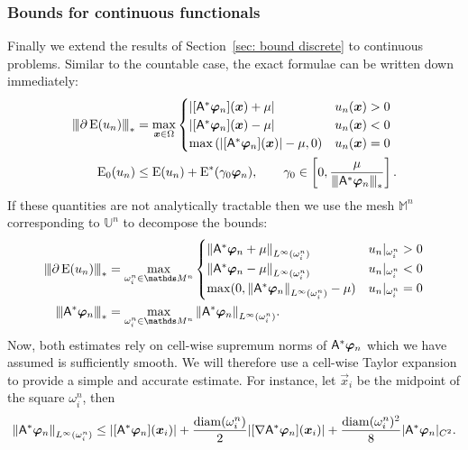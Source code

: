 \documentclass[smallextended]{svjour3}
\let\F\mathds\let\C\mathcal\newcommand{\R}{\F{R}}\newcommand{\A}{\tens{A}}
\newcommand{\norm}[1]{{\left\lVert #1 \right\rVert}}
\newcommand{\Norm}[1]{{\left\vert\kern-0.25ex\left\vert\kern-0.25ex\left\vert #1 \right\vert\kern-0.25ex\right\vert\kern-0.25ex\right\vert}}
\newcommand{\op}[1]{\operatorname{#1}}
\newcommand{\1}{\F{1}}
\newcommand{\Domain}{\Omega}\newcommand{\domain}{\omega}
\newcommand*{\var}[1]{%
	\IfEqCase{#1}{%
		{0}{u}%
		{1}{v}%
		{2}{w}%
	}[u#1]%
}
\newcommand*{\vars}[1]{%
	\IfEqCase{#1}{%
		{0}{\alpha}%
		{1}{\beta}%
		{2}{\gamma}%
		{3}{a}%
		{4}{b}%
		{5}{c}%
	}[k#1]%
}
\begin{document}
	\subsubsection{Bounds for continuous functionals}\label{sec: bound continuous}
	Finally we extend the results of Section~\ref{sec: bound discrete} to continuous problems. Similar to the countable case, the exact formulae can be written down immediately:
	\begin{align}
		\Norm{\partial\op{E}(\var0_n)}_* &= \max_{\vec{x}\in\Domain}\begin{cases}
			|[\A^*\vec{\varphi}_n](\vec{x}) + \mu| & \var0_n(\vec{x})>0
			\\|[\A^*\vec{\varphi}_n](\vec{x}) - \mu| & \var0_n(\vec{x})<0
			\\\max\left(|[\A^*\vec{\varphi}_n](\vec{x})| - \mu, 0\right) & \var0_n(\vec{x}) = 0
		\end{cases}
		\\ \op{E}_0(\var0_n) &\leq \op{E}(\var0_n) + \op{E}^*(\vars2_0\vec{\varphi}_n), \qquad \vars2_0\in\left[0,\frac{\mu}{\Norm{\A^*\vec{\varphi}_n}_*}\right].
	\end{align}
	If these quantities are not analytically tractable then we use the mesh $\F M^n$ corresponding to $\F{U}^n$ to decompose the bounds:
	\begin{align}
		\Norm{\partial \op{E}(\var0_n)}_* &= \max_{\domain_i^n\in\F M^n} \begin{cases}
			\norm{\A^*\vec{\varphi}_n + \mu}_{L^\infty(\domain_i^n)} & \var0_n|_{\domain_i^n} > 0
			\\\norm{\A^*\vec{\varphi}_n - \mu}_{L^\infty(\domain_i^n)} & \var0_n|_{\domain_i^n} < 0
			\\\max(0, \norm{\A^*\vec{\varphi}_n}_{L^\infty(\domain_i^n)}-\mu) & \var0_n|_{\domain_i^n} = 0
		\end{cases}
		\\ \Norm{\A^*\vec{\varphi}_n}_* &= \max_{\domain_i^n\in\F M^n} \norm{\A^*\vec{\varphi}_n}_{L^\infty(\domain_i^n)}.
	\end{align}
	Now, both estimates rely on cell-wise supremum norms of $\A^*\vec{\varphi}_n$ which we have assumed is sufficiently smooth. We will therefore use a cell-wise Taylor expansion to provide a simple and accurate estimate. For instance, let $\vec{x}_i$ be the midpoint of the square $\domain_i^n$, then 
	\begin{equation}\label{eq: Taylor approximation}
		\norm{\A^*\vec{\varphi}_n}_{L^\infty(\domain_i^n)} \leq |[\A^*\vec{\varphi}_n](\vec{x}_i)| + \frac{\op{diam}(\domain_i^n)}{2}|[\nabla\A^*\vec{\varphi}_n](\vec{x}_i)| + \frac{\op{diam}(\domain_i^n)^2}{8}|\A^*\vec{\varphi}_n|_{C^2}.
	\end{equation}
\end{document}

